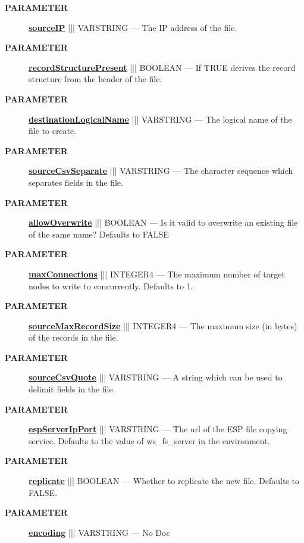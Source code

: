 \begin{description}
\item [\colorbox{tagtype}{\color{white} \textbf{\textsf{PARAMETER}}}] \textbf{\underline{sourceIP}} ||| VARSTRING --- The IP address of the file.
\item [\colorbox{tagtype}{\color{white} \textbf{\textsf{PARAMETER}}}] \textbf{\underline{recordStructurePresent}} ||| BOOLEAN --- If TRUE derives the record structure from the header of the file.
\item [\colorbox{tagtype}{\color{white} \textbf{\textsf{PARAMETER}}}] \textbf{\underline{destinationLogicalName}} ||| VARSTRING --- The logical name of the file to create.
\item [\colorbox{tagtype}{\color{white} \textbf{\textsf{PARAMETER}}}] \textbf{\underline{sourceCsvSeparate}} ||| VARSTRING --- The character sequence which separates fields in the file.
\item [\colorbox{tagtype}{\color{white} \textbf{\textsf{PARAMETER}}}] \textbf{\underline{allowOverwrite}} ||| BOOLEAN --- Is it valid to overwrite an existing file of the same name? Defaults to FALSE
\item [\colorbox{tagtype}{\color{white} \textbf{\textsf{PARAMETER}}}] \textbf{\underline{maxConnections}} ||| INTEGER4 --- The maximum number of target nodes to write to concurrently. Defaults to 1.
\item [\colorbox{tagtype}{\color{white} \textbf{\textsf{PARAMETER}}}] \textbf{\underline{sourceMaxRecordSize}} ||| INTEGER4 --- The maximum size (in bytes) of the records in the file.
\item [\colorbox{tagtype}{\color{white} \textbf{\textsf{PARAMETER}}}] \textbf{\underline{sourceCsvQuote}} ||| VARSTRING --- A string which can be used to delimit fields in the file.
\item [\colorbox{tagtype}{\color{white} \textbf{\textsf{PARAMETER}}}] \textbf{\underline{espServerIpPort}} ||| VARSTRING --- The url of the ESP file copying service. Defaults to the value of ws\_fs\_server in the environment.
\item [\colorbox{tagtype}{\color{white} \textbf{\textsf{PARAMETER}}}] \textbf{\underline{replicate}} ||| BOOLEAN --- Whether to replicate the new file. Defaults to FALSE.
\item [\colorbox{tagtype}{\color{white} \textbf{\textsf{PARAMETER}}}] \textbf{\underline{encoding}} ||| VARSTRING --- No Doc
\end{description}







